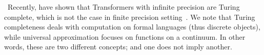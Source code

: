 \documentclass{article} %
\begin{document}
~Recently, \citet{perez2019turing} have shown that Transformers with infinite precision are Turing complete, which is not the case in finite precision setting~\citep{dehghani2018universal}. We note that Turing completeness deals with computation on formal languages (thus discrete objects), while universal approximation focuses on functions on a continuum. In other words, these are two different concepts; and one does not imply another.




\end{document}

